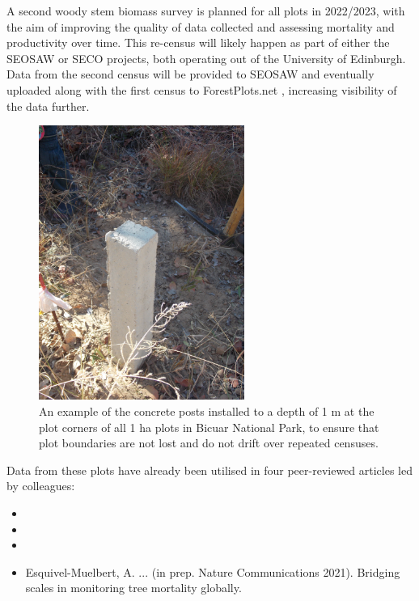 \begin{refsection}
A second woody stem biomass survey is planned for all plots in 2022/2023, with the aim of improving the quality of data collected and assessing mortality and productivity over time. This re-census will likely happen as part of either the SEOSAW or SECO projects, both operating out of the University of Edinburgh. Data from the second census will be provided to SEOSAW and eventually uploaded along with the first census to ForestPlots.net \citep{LopezGonzalez2011}, increasing visibility of the data further.

\begin{figure}[!h]
\centering
	\includegraphics[width=0.6\textwidth]{img/concrete}
	\caption[Concrete corner posts in Bicuar National Park]{An example of the concrete posts installed to a depth of 1 m at the plot corners of all 1 ha plots in
	Bicuar National Park, to ensure that plot boundaries are not lost and do not drift over
repeated censuses.}
	\label{legacy:concrete}
\end{figure}

Data from these plots have already been utilised in four peer-reviewed articles led by colleagues:

\begin{itemize}
	\item{}
	\item{}
	\item{}
	\item{Esquivel-Muelbert, A. ... (in prep. Nature Communications 2021). Bridging scales in monitoring tree mortality globally.}
\end{itemize}


\end{refsection}
